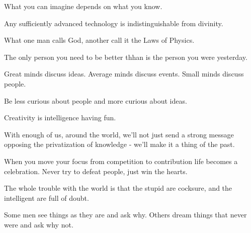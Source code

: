 \documentclass[12pt,a4paper,twoside,openright]{report}
\newcounter{def}
\theoremstyle{definition}
\theoremstyle{itexmp}
\numberwithin{equation}{section}
\begin{document}
 	 \begin{fquote}What you can imagine depends on what you know.
 	\end{fquote}
 	
 	\begin{fquote}Any sufficiently advanced technology is indistinguishable from divinity.
 	\end{fquote}
 	
 	\begin{fquote}What one man calls God, another call it the Laws of Physics.
 	\end{fquote}
 	
 	\begin{fquote}[?]The only person you need to be better thhan is the person you were yesterday.
 	\end{fquote}
 	
 	\begin{fquote}Great minds discuss ideas. Average minds discuss events. Small minds discuss people.
 	\end{fquote}
 	
 	\begin{fquote}Be less curious about people and more curious about ideas.
 	\end{fquote}
 	
 	\begin{fquote}Creativity is intelligence having fun.
 	\end{fquote}
 	
 	\begin{fquote}With enough of us, around the world, we'll not just send a strong message opposing the privatization of knowledge - we'll make it a thing of the past.
 	\end{fquote}
 	
 	\begin{fquote}[Buddha]When you move your focus from competition to contribution life becomes a celebration. Never try to defeat people, just win the hearts.
 	\end{fquote}
 	
 	\begin{fquote}The whole trouble with the world is that the stupid are cocksure, and the intelligent are full of doubt.
 	\end{fquote}
 	
 	\begin{fquote}Some men see things as they are and ask why. Others dream things that never were and ask why not.
 	\end{fquote}
 	
\end{document}
